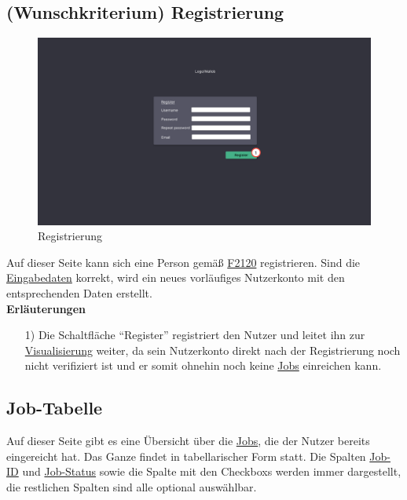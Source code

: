 \subsection{(Wunschkriterium) Registrierung}
\label{pages:register}
\begin{figure}[H]
    \centering
    \includegraphics[width=\textwidth]{images-interface/v4_interface/register_page_4.pdf}
    \caption{Registrierung}
    \label{fig:register}
\end{figure}
Auf dieser Seite kann sich eine Person gemäß \hyperref[FA:Web-Interface:Registrierung von Nutzern]{F2120} registrieren. Sind die \hyperref[PD:Registrierungsdaten]{Eingabedaten} korrekt, wird ein neues vorläufiges \gls{Nutzerkonto} mit den entsprechenden Daten erstellt. \\


\textbf{Erläuterungen}
\begin{itemize}
    \item[1)] Die Schaltfläche \enquote{Register} registriert den \gls{Nutzer} und leitet ihn zur \hyperref[pages:visualization]{Visualisierung} weiter, da sein \gls{Nutzerkonto} direkt nach der Registrierung noch nicht verifiziert ist und er somit ohnehin noch keine \hyperref[B:Jobs]{Jobs} einreichen kann.
\end{itemize}



\newpage
\subsection{Job-Tabelle}
\label{pages:job-table}
Auf dieser Seite gibt es eine Übersicht über die \hyperref[B:Jobs]{Jobs}, die der \gls{Nutzer} bereits eingereicht hat. Das Ganze findet in tabellarischer Form statt. Die Spalten \hyperref[B:Job-ID]{Job-ID} und \hyperref[B:Job-Status]{Job-Status} sowie die Spalte mit den \glspl{Checkbox} werden immer dargestellt, die restlichen Spalten sind alle optional auswählbar.\\

